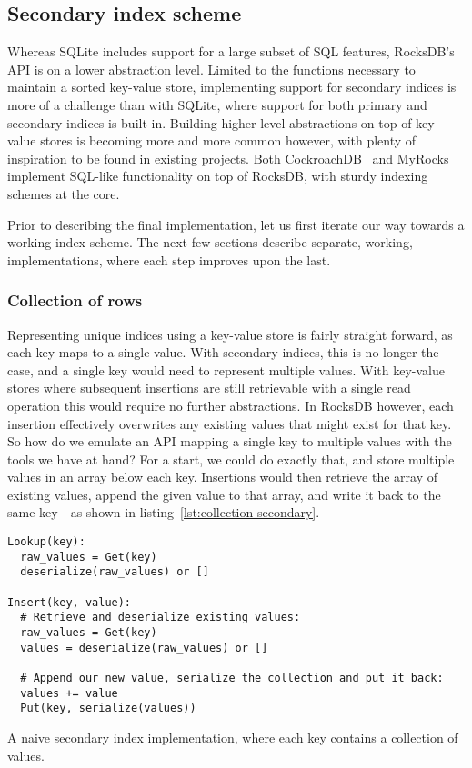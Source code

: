 \subsection{Secondary index scheme}

Whereas SQLite includes support for a large subset of SQL features, RocksDB's
API is on a lower abstraction level. Limited to the functions necessary to
maintain a sorted key-value store, implementing support for secondary indices is
more of a challenge than with SQLite, where support for both primary and
secondary indices is built in. Building higher level abstractions on top of
key-value stores is becoming more and more common however, with plenty of
inspiration to be found in existing projects. Both CockroachDB~\cite{cockroach}
and MyRocks~\cite{myrocks} implement SQL-like functionality on top of RocksDB,
with sturdy indexing schemes at the core.

Prior to describing the final implementation, let us first iterate our way
towards a working index scheme. The next few sections describe separate,
working, implementations, where each step improves upon the last.

\subsubsection{Collection of rows}

Representing unique indices using a key-value store is fairly straight forward,
as each key maps to a single value. With secondary indices, this is no longer
the case, and a single key would need to represent multiple values. With
key-value stores where subsequent insertions are still retrievable with a single
read operation this would require no further abstractions. In RocksDB however,
each insertion effectively overwrites any existing values that might exist for
that key. So how do we emulate an API mapping a single key to multiple values
with the tools we have at hand? For a start, we could do exactly that, and store
multiple values in an array below each key. Insertions would then retrieve the
array of existing values, append the given value to that array, and write it
back to the same key---as shown in listing~\ref{lst:collection-secondary}.

\begin{listing}[H]
  \begin{verbatim}
Lookup(key):
  raw_values = Get(key)
  deserialize(raw_values) or []

Insert(key, value):
  # Retrieve and deserialize existing values:
  raw_values = Get(key)
  values = deserialize(raw_values) or []

  # Append our new value, serialize the collection and put it back:
  values += value
  Put(key, serialize(values))
  \end{verbatim}

  \caption{A naive secondary index implementation, where each key contains a
  collection of values.}\label{lst:collection-secondary}
\end{listing}

